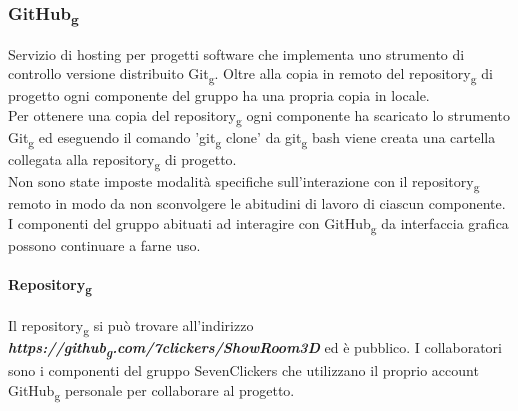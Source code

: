 \subsubsection{GitHub\textsubscript{g}}
\label{GitHub\textsubscript{g}} 
Servizio di hosting per progetti software che implementa uno strumento di controllo versione distribuito Git\textsubscript{g}.
Oltre alla copia in remoto del repository\textsubscript{g} di progetto ogni componente del gruppo ha una propria copia in locale.\\
Per ottenere una copia del repository\textsubscript{g} ogni componente ha scaricato lo strumento Git\textsubscript{g} ed eseguendo il 
comando 'git\textsubscript{g} clone' da git\textsubscript{g} bash viene creata una cartella collegata alla repository\textsubscript{g} di progetto.\\
Non sono state imposte modalità specifiche sull'interazione con il repository\textsubscript{g} remoto in modo da non sconvolgere le abitudini di lavoro di 
ciascun componente.\\
I componenti del gruppo abituati ad interagire con GitHub\textsubscript{g} da interfaccia grafica possono continuare a farne uso.
\paragraph{Repository\textsubscript{g}}
Il repository\textsubscript{g} si può trovare all'indirizzo \textbf{\textit{https://github\textsubscript{g}.com/7clickers/ShowRoom3D}} ed è pubblico. 
I collaboratori sono i componenti del gruppo SevenClickers che utilizzano il proprio account GitHub\textsubscript{g} personale per collaborare al progetto.
